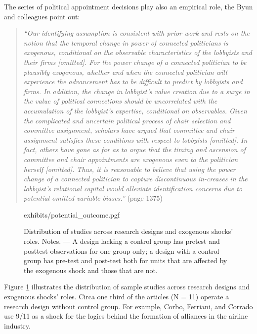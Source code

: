 \begin{refsection}
The series of political appointment decisions play also an empirical role, the 
Byun and colleagues point out: 

\begin{quote}
  \textit{
    ``Our identifying assumption is consistent with prior work and rests on the
    notion that the temporal change in power of connected politicians is
    exogenous, conditional on the observable characteristics of the lobbyists
    and their firms [omitted]. For the power change of a connected politician to
    be plausibly exogenous, whether and when the connected politician will
    experience the advancement has to be difficult to predict by lobbyists and
    firms. In addition, the change in lobbyist's value creation due to a surge
    in the value of political connections should be uncorrelated with the
    accumulation of the lobbyist's expertise, conditional on observables. Given
    the complicated and uncertain political process of chair selection and
    committee assignment, scholars have argued that committee and chair
    assignment satisfies these conditions with respect to lobbyists [omitted].
    In fact, others have gone as far as to argue that the timing and ascension
    of committee and chair appointments are exogenous even to the politician
    herself [omitted]. Thus, it is reasonable to believe that using the power
    change of a connected politician to capture discontinuous in-creases in the
    lobbyist's relational capital would alleviate identification concerns due to
    potential omitted variable biases.''
  }
  (page 1375)
\end{quote}

\begin{figure}
  \raggedleft
  \begin{small}
    {exhibits/potential_outcome.pgf}
    \caption{
      Distribution of studies across research designs and exogenous shocks'
      roles. Notes. --- A design lacking a control group has pretest and posttest
      observations for one group only; a design with a control group has
      pre-test and post-test both for units that are affected by the exogenous
      shock and those that are not.
    }
    \label{fig:potential_outcome}
  \end{small}
\end{figure}

Figure \ref{fig:potential_outcome} illustrates the distribution of sample studies 
across research designs and exogenous shocks' roles. Circa one third of 
the articles (N = 11) operate a research design without control group. For
example, Corbo, Ferriani, and Corrado \parencite*{corbo2016323} use 9/11 
as a shock for the logics behind the formation of alliances in the airline industry.



\end{refsection}

